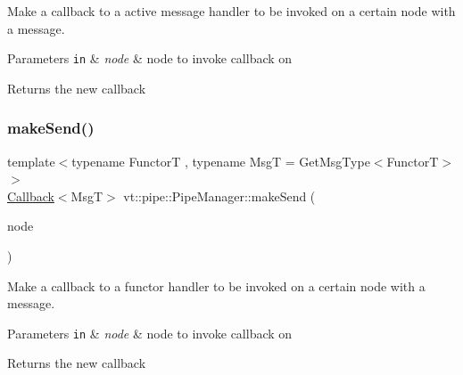 Make a callback to a active message handler to be invoked on a certain node with a message. 


\begin{DoxyParams}[1]{Parameters}
\mbox{\tt in}  & {\em node} & node to invoke callback on\\
\hline
\end{DoxyParams}
\begin{DoxyReturn}{Returns}
the new callback 
\end{DoxyReturn}
\mbox{\label{structvt_1_1pipe_1_1_pipe_manager_a0fc60c66ec9c02e2c1874e08194cac44}} 
\subsubsection{\texorpdfstring{make\+Send()}{makeSend()}\hspace{0.1cm}{\footnotesize\ttfamily [2/6]}}
{\footnotesize\ttfamily template$<$typename FunctorT , typename MsgT  = Get\+Msg\+Type$<$\+Functor\+T$>$$>$ \\
\hyperlink{namespacevt_a36db99df4c973d48b1118a293fff533f}{Callback}$<$MsgT$>$ vt\+::pipe\+::\+Pipe\+Manager\+::make\+Send (\begin{DoxyParamCaption}\item[{\hyperlink{namespacevt_a866da9d0efc19c0a1ce79e9e492f47e2}{Node\+Type} const \&}]{node }\end{DoxyParamCaption})}



Make a callback to a functor handler to be invoked on a certain node with a message. 


\begin{DoxyParams}[1]{Parameters}
\mbox{\tt in}  & {\em node} & node to invoke callback on\\
\hline
\end{DoxyParams}
\begin{DoxyReturn}{Returns}
the new callback 
\end{DoxyReturn}
\mbox{\label{structvt_1_1pipe_1_1_pipe_manager_a89f95b27b13c69f2fe84dc29fd604082}} 
